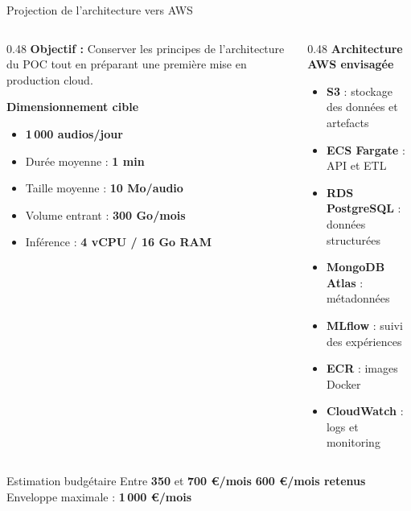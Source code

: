 \begin{frame}{Projection de l'architecture vers AWS}
	\small
	
	\begin{columns}[T]
		\begin{column}{0.48\textwidth}
			\textbf{Objectif :} Conserver les principes de l'architecture du POC tout en préparant une première mise en production cloud.
			
			\vspace{0.2cm}
			
			\textbf{Dimensionnement cible}
			\begin{itemize}
				\item \textbf{1\,000 audios/jour}
				\item Durée moyenne : \textbf{1 min}
				\item Taille moyenne : \textbf{10 Mo/audio}
				\item Volume entrant : \textbf{300 Go/mois}
				\item Inférence : \textbf{4 vCPU / 16 Go RAM}
			\end{itemize}
		\end{column}
		
		\begin{column}{0.48\textwidth}
			\textbf{Architecture AWS envisagée}
			\begin{itemize}
				\item \textbf{S3} : stockage des données et artefacts
				\item \textbf{ECS Fargate} : API et ETL
				\item \textbf{RDS PostgreSQL} : données structurées
				\item \textbf{MongoDB Atlas} : métadonnées
				\item \textbf{MLflow} : suivi des expériences
				\item \textbf{ECR} : images Docker
				\item \textbf{CloudWatch} : logs et monitoring
			\end{itemize}
		\end{column}
	\end{columns}
	
	\begin{block}{Estimation budgétaire}
	\centering
	Entre \textbf{350} et \textbf{700 €/mois}\hfill
	\textbf{600 €/mois retenus}\hfill
	Enveloppe maximale : \textbf{1\,000 €/mois}
	\end{block}
\end{frame}